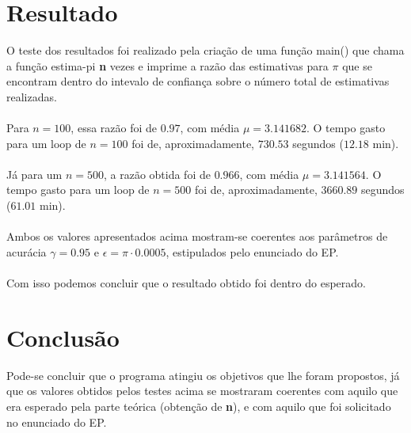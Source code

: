\documentclass{article}
\begin{document}
\section{Resultado}

    O teste dos resultados foi realizado pela criação de uma função main() que chama a função estima-pi \textbf{n} vezes e imprime a razão das estimativas para $\pi$ que se encontram dentro do intevalo de confiança sobre o número total de estimativas realizadas.\\
    \\
    Para $n = 100$, essa razão foi de $0.97$, com média $\mu = 3.141682$. O tempo gasto para um loop de $n = 100$ foi de, aproximadamente, $730.53$ segundos ($12.18$ min).\\
    \\
    Já para um $n = 500$, a razão obtida foi de $0.966$, com média $\mu = 3.141564$. O tempo gasto para um loop de $n = 500$ foi de, aproximadamente, $3660.89$ segundos ($61.01$ min).\\
    \\
    Ambos os valores apresentados acima mostram-se coerentes aos parâmetros de acurácia $\gamma = 0.95$ e $\epsilon = \pi \cdot0.0005$, estipulados pelo enunciado do EP. \\
    \\
    Com isso podemos concluir que o resultado obtido foi dentro do esperado.

\section{Conclusão}

    Pode-se concluir que o programa atingiu os objetivos que lhe foram propostos, já que os valores obtidos pelos testes acima se mostraram coerentes com aquilo que era esperado pela parte teórica (obtenção de \textbf{n}), e com aquilo que foi solicitado no enunciado do EP.
\end{document}
